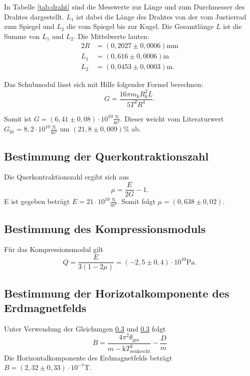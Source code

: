 In Tabelle \ref{tab:draht} sind die Messwerte zur Länge und zum Durchmesser des Drahtes dargestellt. $L_1$ ist dabei die Länge des Drahtes von der vom Justierrad zum Spiegel und $L_2$ die vom Spiegel bis zur Kugel. Die Gesamtlänge $L$ ist die Summe von $L_1$ und $L_2$.
Die Mittelwerte lauten:
\begin{align}
  2R&=(0,2027 \pm 0,0006)\si{\milli\meter} \\
  L_1&=(0,616 \pm 0,0006)\si{\meter} \\
  L_2&=(0,0453 \pm 0,0003) \si{\meter}.
\end{align}

Das Schubmodul lässt sich mit Hilfe folgender Formel berechnen:
\begin{equation}
  G = \frac{16\pi m_\mathrm{k} R_\mathrm{k}^2 L}{5T^2 R^4}.
\end{equation}

Somit ist $G=(6,41 \pm 0,08)\cdot 10^{10} \frac{\si{\newton}}{\si{\meter}^2}$.
Dieser weicht vom Literaturwert $G_\mathrm{lit} = 8,2 \cdot 10^{10}\frac{\si{\newton}}{\si{\meter}^2}$ um $(21,8 \pm 0,009)\%$ ab.

\subsection{Bestimmung der Querkontraktionszahl}
Die Querkontraktionszahl ergibt sich aus
\begin{equation}
  \mu = \frac{E}{2G}-1.
\end{equation}
E ist gegeben beträgt $E=21 \cdot 10^{10} \frac{\si{\newton}}{\si{\meter}^2}$.
Somit folgt $\mu = (0,638 \pm 0,02)$.

\subsection{Bestimmung des Kompressionsmoduls}
 Für das Kompressionsmodul gilt
 \begin{equation}
   Q = \frac{E}{3(1-2\mu)} = (-2,5 \pm 0,4)\cdot 10^{10} \si{\pascal}.
\end{equation}


\subsection{Bestimmung der Horizotalkomponente des Erdmagnetfelds}

Unter Verwendung der Gleichungen \ref{} und \ref{} folgt
\begin{equation}
  B = \frac{4\pi^2 \theta_\mathrm{ges}}{m-\mathrm{k}T_\mathrm{senkrecht}^2} - \frac{D}{m}
\end{equation}
Die Horizontalkomponente des Erdmagnetfelds beträgt $B=(2,32 \pm 0,33)\cdot 10^{-7}\si{\tesla}$.

